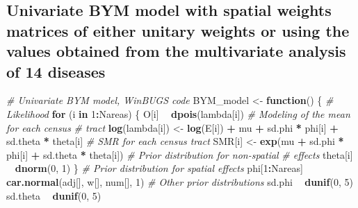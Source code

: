 \documentclass[]{article}
\newenvironment{Shaded}{\begin{snugshade}}{\end{snugshade}}
\newcommand{\KeywordTok}[1]{\textcolor[rgb]{0.13,0.29,0.53}{\textbf{#1}}}
\newcommand{\DecValTok}[1]{\textcolor[rgb]{0.00,0.00,0.81}{#1}}
\newcommand{\StringTok}[1]{\textcolor[rgb]{0.31,0.60,0.02}{#1}}
\newcommand{\CommentTok}[1]{\textcolor[rgb]{0.56,0.35,0.01}{\textit{#1}}}
\newcommand{\ControlFlowTok}[1]{\textcolor[rgb]{0.13,0.29,0.53}{\textbf{#1}}}
\newcommand{\OperatorTok}[1]{\textcolor[rgb]{0.81,0.36,0.00}{\textbf{#1}}}
\newcommand{\NormalTok}[1]{#1}
\begin{document}
\subsection{Univariate BYM model with spatial weights matrices of either
unitary weights or using the values obtained from the multivariate
analysis of 14
diseases}\label{univariate-bym-model-with-spatial-weights-matrices-of-either-unitary-weights-or-using-the-values-obtained-from-the-multivariate-analysis-of-14-diseases}

\begin{Shaded}
\begin{Highlighting}[]
\CommentTok{# Univariate BYM model, WinBUGS code}
\NormalTok{BYM_model <-}\StringTok{ }\ControlFlowTok{function}\NormalTok{() \{}
    \CommentTok{# Likelihood}
    \ControlFlowTok{for}\NormalTok{ (i }\ControlFlowTok{in} \DecValTok{1}\OperatorTok{:}\NormalTok{Nareas) \{}
\NormalTok{        O[i] }\OperatorTok{~}\StringTok{ }\KeywordTok{dpois}\NormalTok{(lambda[i])}
        \CommentTok{# Modeling of the mean for each census}
        \CommentTok{# tract}
        \KeywordTok{log}\NormalTok{(lambda[i]) <-}\StringTok{ }\KeywordTok{log}\NormalTok{(E[i]) }\OperatorTok{+}\StringTok{ }\NormalTok{mu }\OperatorTok{+}\StringTok{ }
\StringTok{            }\NormalTok{sd.phi }\OperatorTok{*}\StringTok{ }\NormalTok{phi[i] }\OperatorTok{+}\StringTok{ }\NormalTok{sd.theta }\OperatorTok{*}\StringTok{ }
\StringTok{            }\NormalTok{theta[i]}
        \CommentTok{# SMR for each census tract}
\NormalTok{        SMR[i] <-}\StringTok{ }\KeywordTok{exp}\NormalTok{(mu }\OperatorTok{+}\StringTok{ }\NormalTok{sd.phi }\OperatorTok{*}\StringTok{ }\NormalTok{phi[i] }\OperatorTok{+}\StringTok{ }
\StringTok{            }\NormalTok{sd.theta }\OperatorTok{*}\StringTok{ }\NormalTok{theta[i])}
        \CommentTok{# Prior distribution for non-spatial}
        \CommentTok{# effects}
\NormalTok{        theta[i] }\OperatorTok{~}\StringTok{ }\KeywordTok{dnorm}\NormalTok{(}\DecValTok{0}\NormalTok{, }\DecValTok{1}\NormalTok{)}
\NormalTok{    \}}
    \CommentTok{# Prior distribution for spatial effects}
\NormalTok{    phi[}\DecValTok{1}\OperatorTok{:}\NormalTok{Nareas] }\OperatorTok{~}\StringTok{ }\KeywordTok{car.normal}\NormalTok{(adj[], w[], }
\NormalTok{        num[], }\DecValTok{1}\NormalTok{)}
    \CommentTok{# Other prior distributions}
\NormalTok{    sd.phi }\OperatorTok{~}\StringTok{ }\KeywordTok{dunif}\NormalTok{(}\DecValTok{0}\NormalTok{, }\DecValTok{5}\NormalTok{)}
\NormalTok{    sd.theta }\OperatorTok{~}\StringTok{ }\KeywordTok{dunif}\NormalTok{(}\DecValTok{0}\NormalTok{, }\DecValTok{5}\NormalTok{)}

\end{Highlighting}
\end{Shaded}
\end{document}
